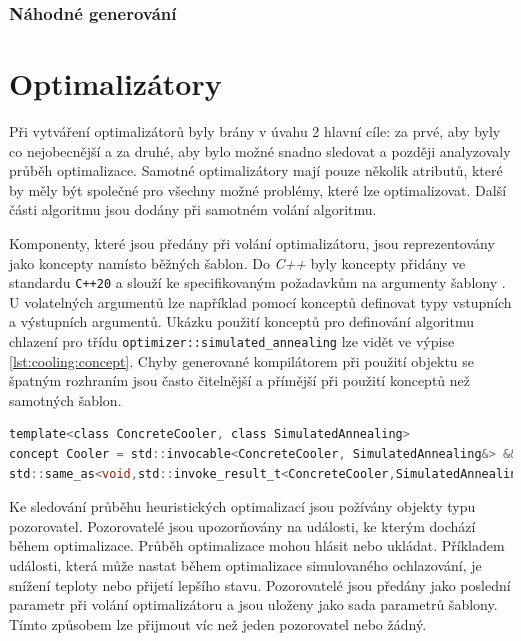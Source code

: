 \subsubsection{Náhodné generování}

\section{Optimalizátory}
Při vytváření optimalizátorů byly brány v úvahu 2 hlavní cíle: za prvé, aby byly co nejobecnější a za druhé, aby bylo možné snadno sledovat a později analyzovaly průběh optimalizace.
Samotné optimalizátory mají pouze několik atributů, které by měly být společné pro všechny možné problémy, které lze optimalizovat.
Další části algoritmu jsou dodány při samotném volání algoritmu.

Komponenty, které jsou předány při volání optimalizátoru, jsou reprezentovány jako koncepty namísto běžných šablon.
Do \textit{C++} byly koncepty přidány ve standardu \texttt{C++20} a slouží ke specifikovaným požadavkům na argumenty šablony \cite{concepts}.
U volatelných argumentů lze například pomocí konceptů definovat typy vstupních a výstupních argumentů.
Ukázku použití konceptů pro definování algoritmu chlazení pro třídu \texttt{optimizer::simulated\_annealing} lze vidět ve výpise \ref{lst:cooling:concept}.
Chyby generované kompilátorem při použití objektu se špatným rozhraním jsou často čitelnější a přímější při použití konceptů než samotných šablon.

\begin{lstlisting}[caption={~Koncept pro kontrolu chladícího algoritmu},label={lst:cooling:concept},captionpos=t,abovecaptionskip=-\medskipamount,belowcaptionskip=\medskipamount,language=C]
template<class ConcreteCooler, class SimulatedAnnealing>
concept Cooler = std::invocable<ConcreteCooler, SimulatedAnnealing&> &&
std::same_as<void,std::invoke_result_t<ConcreteCooler,SimulatedAnnealing&>>;
\end{lstlisting}


Ke sledování průběhu heuristických optimalizací jsou požívány objekty typu pozorovatel.
Pozorovatelé jsou upozorňovány na události, ke kterým dochází během optimalizace.
Průběh optimalizace mohou hlásit nebo ukládat.
Příkladem události, která může nastat během optimalizace simulovaného ochlazování, je snížení teploty nebo přijetí lepšího stavu.
Pozorovatelé jsou předány jako poslední parametr při volání optimalizátoru a jsou uloženy jako sada parametrů šablony.
Tímto způsobem lze přijmout víc než jeden pozorovatel nebo žádný.


